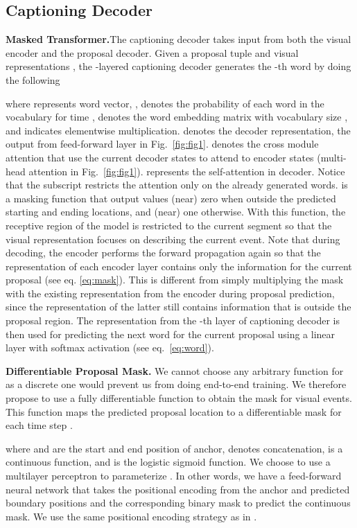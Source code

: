\documentclass[10pt,twocolumn,letterpaper]{article}
\begin{document}
\subsection{Captioning Decoder} 
\label{sec:caption}

\noindent\textbf{Masked Transformer.}\quad The captioning decoder takes input from both the visual encoder and the proposal decoder. Given a proposal tuple  and visual representations , the -layered captioning decoder generates the -th word by doing the following

where  represents word vector, ,  denotes the probability of each word in the vocabulary for time ,  denotes the word embedding matrix with vocabulary size , and  indicates elementwise multiplication.  denotes the decoder representation, \ie the output from feed-forward layer in Fig.~\ref{fig:fig1}.  denotes the cross module attention that use the current decoder states to attend to encoder states (\ie multi-head attention in Fig.~\ref{fig:fig1}).  represents the self-attention in decoder. Notice that the subscript  restricts the attention only on the already generated words.   is a masking function that output values (near) zero when outside the predicted starting and ending locations, and (near) one otherwise. With this function, the receptive region of the model is restricted to the current segment so that the visual representation focuses on describing the current event. Note that during decoding, the encoder performs the forward propagation again so that the representation of each encoder layer contains only the information for the current proposal (see eq. \ref{eq:mask}). This is different from simply multiplying the mask with the existing representation from the encoder during proposal prediction, since the representation of the latter still contains information that is outside the proposal region. The representation from the -th layer of captioning decoder is then used for predicting the next word for the current proposal using a linear layer with softmax activation (see eq.~\ref{eq:word}).

\noindent \textbf{Differentiable Proposal Mask.}\quad
We cannot choose any arbitrary function for  as a discrete one would prevent us from doing end-to-end training. We therefore propose to use a fully differentiable function to obtain the mask for visual events.
This function  maps the predicted proposal location to a differentiable mask  for each time step .



where  and  are the start and end position of anchor,  denotes concatenation,  is a continuous function, and  is the logistic sigmoid function. We choose to use a multilayer perceptron to parameterize . In other words, we have a feed-forward neural network that takes the positional encoding from the anchor and predicted boundary positions and the corresponding binary mask to predict the continuous mask. We use the same positional encoding strategy as in \cite{vaswani2017attention}.
\end{document}
